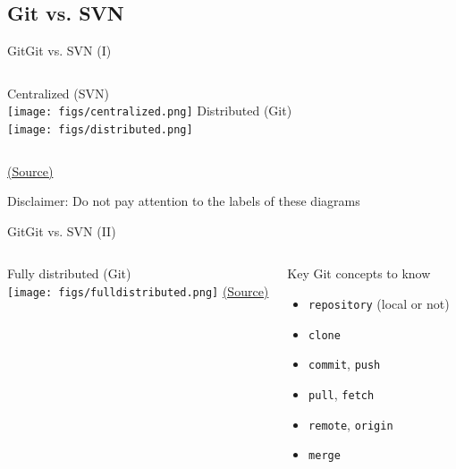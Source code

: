 \documentclass[10pt,compress]{beamer} %
\begin{document}
\subsection{Git vs. SVN}

\begin{frame}{Git}{Git vs. SVN (I)}
\begin{center}
\begin{columns}
	\centering Centralized (SVN)\\\smallskip
\texttt{[image: figs/centralized.png]}
	\centering Distributed (Git)\\\smallskip
\texttt{[image: figs/distributed.png]}
\end{columns}

\tiny \href{http://softwareengineering.stackexchange.com/questions/35074/im-a-subversion-geek-why-should-i-consider-or-not-consider-mercurial-or-git-or}{(Source)}
\end{center}
	Disclaimer: Do not pay attention to the labels of these diagrams
\end{frame}



\begin{frame}{Git}{Git vs. SVN (II)}
\begin{center}
\begin{columns}
	\centering Fully distributed (Git)\\\smallskip
	\texttt{[image: figs/fulldistributed.png]}
	\tiny \href{http://softwareengineering.stackexchange.com/questions/35074/im-a-subversion-geek-why-should-i-consider-or-not-consider-mercurial-or-git-or}{(Source)}

	\begin{block}{Key Git concepts to know}
	\begin{itemize}
	\item \texttt{repository} (local or not)
	\item \texttt{clone}
	\item \texttt{commit}, \texttt{push}
	\item \texttt{pull}, \texttt{fetch} 
	\item \texttt{remote}, \texttt{origin}
	\item \texttt{merge}
	\end{itemize}
	\end{block}
\end{columns}
\end{center}
\end{frame}
\end{document}
